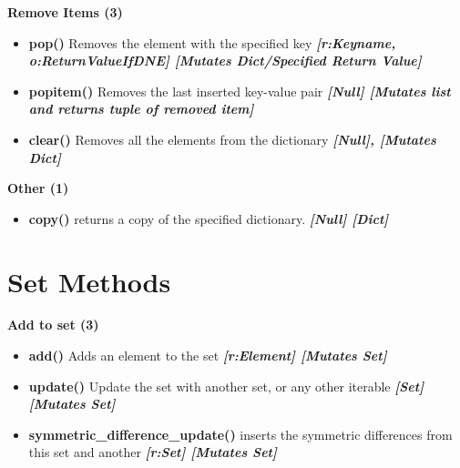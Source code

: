 \documentclass{report}
\begin{document}
    \bigbreak \noindent 
    
        \begin{center}
            \textbf{Remove Items (3)}
        \end{center}
        \begin{itemize}
            \item[\ding{43}] \textbf{pop()}		Removes the element with the specified key
                \smallbreak \noindent
                \textbf{\textit{[r:Keyname, o:ReturnValueIfDNE] [Mutates Dict/Specified Return Value]}}
                \smallbreak \noindent
            \item[\ding{43}] \textbf{popitem()}	Removes the last inserted key-value pair
                \smallbreak \noindent
                \textbf{\textit{[Null] [Mutates list and returns tuple of removed item]}}
                \smallbreak \noindent
            \item[\ding{43}] \textbf{clear()}		Removes all the elements from the dictionary
                \smallbreak \noindent
                \textbf{\textit{[Null], [Mutates Dict]}}
        \end{itemize}
    

    \bigbreak \noindent 
    
        \begin{center}
           \textbf{Other (1)} 
        \end{center}
    \begin{itemize}
        \item[\ding{43}] \textbf{copy()} returns a copy of the specified dictionary.
            \smallbreak \noindent
            \textbf{\textit{[Null] [Dict]}}
    \end{itemize}
    

    \pagebreak \bigbreak \noindent 
    \section{\LARGE Set Methods}
    \bigbreak \noindent 
    
        \begin{center}
            \textbf{Add to set (3)}
        \end{center}
        \begin{itemize}
            \item[\ding{43}] \textbf{add()}	Adds an element to the set
                \smallbreak
                \textbf{\textit{[r:Element] [Mutates Set]}}
                \smallbreak \noindent
            \item[\ding{43}] \textbf{update()}	Update the set with another set, or any other iterable
                \smallbreak \noindent
                \textbf{\textit{[Set] [Mutates Set]}}
                \smallbreak \noindent
            \item[\ding{43}] \textbf{symmetric\_difference\_update()}	inserts the symmetric differences from this set and another
              \smallbreak \noindent
              \textbf{\textit{[r:Set] [Mutates Set]}}
        \end{itemize}
    
\end{document}
